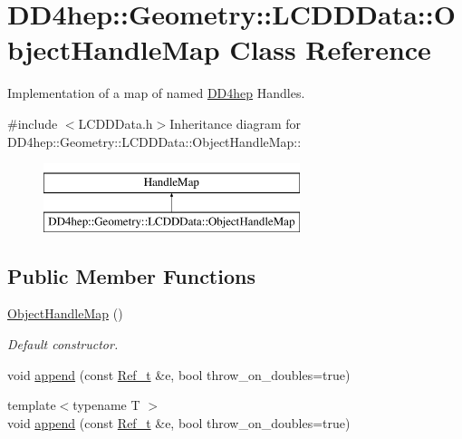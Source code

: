 \hypertarget{class_d_d4hep_1_1_geometry_1_1_l_c_d_d_data_1_1_object_handle_map}{
\section{DD4hep::Geometry::LCDDData::ObjectHandleMap Class Reference}
\label{class_d_d4hep_1_1_geometry_1_1_l_c_d_d_data_1_1_object_handle_map}
}


Implementation of a map of named \hyperlink{namespace_d_d4hep}{DD4hep} Handles.  


{\ttfamily \#include $<$LCDDData.h$>$}Inheritance diagram for DD4hep::Geometry::LCDDData::ObjectHandleMap::\begin{figure}[H]
\begin{center}
\leavevmode
\includegraphics[height=2cm]{class_d_d4hep_1_1_geometry_1_1_l_c_d_d_data_1_1_object_handle_map}
\end{center}
\end{figure}
\subsection*{Public Member Functions}
\begin{DoxyCompactItemize}
\item 
\hyperlink{class_d_d4hep_1_1_geometry_1_1_l_c_d_d_data_1_1_object_handle_map_aacc5d9dd1f2e355617b5a215c66f924b}{ObjectHandleMap} ()
\begin{DoxyCompactList}\small\item\em Default constructor. \item\end{DoxyCompactList}\item 
void \hyperlink{class_d_d4hep_1_1_geometry_1_1_l_c_d_d_data_1_1_object_handle_map_a8881f90a02ef95a6a2e558f092e8f81a}{append} (const \hyperlink{group___d_d4_h_e_p___g_e_o_m_e_t_r_y_ga40af83be6718bb8828a3d83dc7f8c930}{Ref\_\-t} \&e, bool throw\_\-on\_\-doubles=true)
\item 
{\footnotesize template$<$typename T $>$ }\\void \hyperlink{class_d_d4hep_1_1_geometry_1_1_l_c_d_d_data_1_1_object_handle_map_a8881f90a02ef95a6a2e558f092e8f81a}{append} (const \hyperlink{group___d_d4_h_e_p___g_e_o_m_e_t_r_y_ga40af83be6718bb8828a3d83dc7f8c930}{Ref\_\-t} \&e, bool throw\_\-on\_\-doubles=true)
\end{DoxyCompactItemize}


